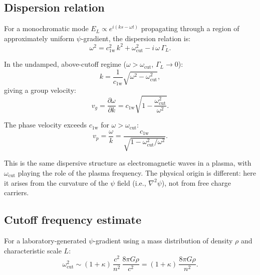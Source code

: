 \documentclass[aps,prd,twocolumn,superscriptaddress,nofootinbib,floatfix]{revtex4-2}
\newcommand{\psifield}{\psi}
\newcommand{\cfield}{c_{\text{1w}}}
\newcommand{\cvac}{c}
\begin{document}
\subsection{Dispersion relation}
\label{subsec:dispersion}

For a monochromatic mode $E_L \propto e^{i(ks - \omega t)}$
propagating through a region of approximately uniform
$\psifield$-gradient, the dispersion relation is:
\begin{equation}
\omega^2 = \cfield^2\,k^2 + \omega_{\text{cut}}^2
- i\,\omega\,\Gamma_L.
\label{eq:dispersion}
\end{equation}

In the undamped, above-cutoff regime
($\omega > \omega_{\text{cut}}$, $\Gamma_L \to 0$):
\begin{equation}
k = \frac{1}{\cfield}\sqrt{\omega^2 - \omega_{\text{cut}}^2},
\label{eq:wavenumber}
\end{equation}
giving a group velocity:
\begin{equation}
v_g = \frac{\partial\omega}{\partial k}
= \cfield\sqrt{1 - \frac{\omega_{\text{cut}}^2}{\omega^2}}.
\label{eq:group_velocity}
\end{equation}

The phase velocity exceeds $\cfield$ for
$\omega > \omega_{\text{cut}}$:
\begin{equation}
v_p = \frac{\omega}{k}
= \frac{\cfield}{\sqrt{1 - \omega_{\text{cut}}^2/\omega^2}}.
\label{eq:phase_velocity}
\end{equation}

This is the same dispersive structure as electromagnetic waves in
a plasma, with $\omega_{\text{cut}}$ playing the role of the plasma
frequency. The physical origin is different: here it arises from the
curvature of the $\psifield$ field (i.e., $\nabla^2\psifield$),
not from free charge carriers.

\subsection{Cutoff frequency estimate}

For a laboratory-generated $\psifield$-gradient using a mass
distribution of density $\rho$ and characteristic scale $L$:
\begin{equation}
\omega_{\text{cut}}^2 \sim (1+\kappa)\,\frac{\cvac^2}{n^2}\,
\frac{8\pi G\rho}{\cvac^2}
= (1+\kappa)\,\frac{8\pi G\rho}{n^2}.
\label{eq:cutoff_estimate}
\end{equation}
\end{document}
